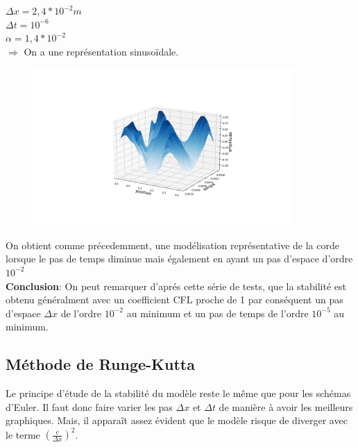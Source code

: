 \begin{enumerate}[label=\alph*)]
\begin{minipage}{.45\textwidth}%

\item $\Delta x=2,4*{10}^{-2}m$ \\
$\Delta t= {10}^{-6}$ \\
$\alpha=1,4*{10}^{-2} $\\


$\Longrightarrow$ On a une représentation sinusoïdale. 
\end{minipage}%
\hfill
\begin{minipage}{.6\textwidth}%

\includegraphics[width=12cm,height=6cm]{dt=10^-6 avec dx=0.024.png}
\end{minipage}
On obtient comme précedemment, une modélisation représentative de la corde lorsque le pas de temps diminue mais également en ayant un pas d'espace d'ordre ${10}^{-2}$\\


\textbf{Conclusion}: On peut remarquer d'aprés cette série de tests, que la stabilité est obtenu généralment avec un coefficient CFL proche de 1 par conséquent un pas d'espace $\Delta x$ de l'ordre ${10}^{-2}$ au minimum et un pas de temps de l'ordre ${10}^{-5}$ au minimum.   


\end{enumerate}

\subsection{Méthode de Runge-Kutta}
Le principe d'étude de la stabilité du modèle reste le même que pour les schémas d'Euler. Il faut donc faire varier les pas $\Delta x$ et $\Delta t$ de manière à avoir les meilleurs graphiques.
Mais, il apparaît assez évident que le modèle risque de diverger avec le terme $(\frac{c}{\Delta x})^2$.\\

